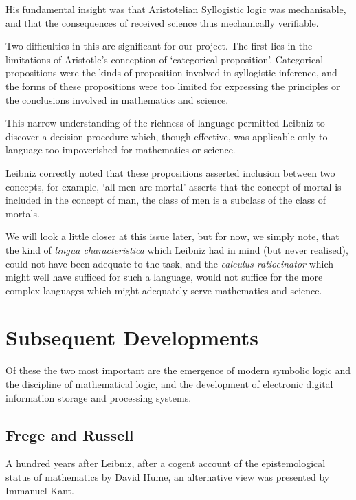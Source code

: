 His fundamental insight was that Aristotelian Syllogistic logic was mechanisable, and that the consequences of received science thus mechanically verifiable.

Two difficulties in this are significant for our project.
The first lies in the limitations of Aristotle's conception of `categorical proposition'.
Categorical propositions were the kinds of proposition involved in syllogistic inference, and the forms of these propositions were too limited for expressing the principles or the conclusions involved in mathematics and science.

This narrow understanding of the richness of language permitted Leibniz to discover a decision procedure which, though effective, was applicable only to language too impoverished for mathematics or science.

Leibniz correctly noted that these propositions asserted inclusion between two concepts, for example, `all men are mortal' asserts that the concept of mortal is included in the concept of man, the class of men is a subclass of the class of mortals.

We will look a little closer at this issue later, but for now, we simply note, that the kind of \emph{lingua characteristica} which Leibniz had in mind (but never realised), could not have been adequate to the task, and the \emph{calculus ratiocinator} which might well have sufficed for such a language, would not suffice for the more complex languages which might adequately serve mathematics and science.

\section{Subsequent Developments}

Of these the two most important are the emergence of modern symbolic logic and the discipline of mathematical logic, and the development of electronic digital information storage and processing systems.

\subsection{Frege and Russell}


A hundred years after Leibniz, after a cogent account of the epistemological status of mathematics by David Hume, an alternative view was presented by Immanuel Kant.

